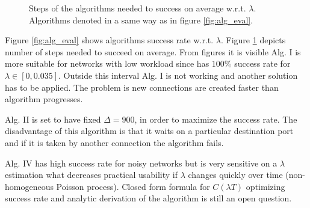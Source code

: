 \documentclass{llncs}
\begin{document}
\begin{figure}[H]
{}
\caption{Steps of the algorithms needed to success on average w.r.t. $\lambda$. Algorithms denoted in a same way as in figure \ref{fig:alg_eval}.}
\label{fig:alg_steps}
\end{figure}
Figure \ref{fig:alg_eval} shows algorithms success rate w.r.t. $\lambda$. 
Figure \ref{fig:alg_steps} depicts number of steps needed 
to succeed on average. From figures it is visible Alg. I is more suitable for networks with low 
workload since has $100\%$ success rate for $\lambda \in [0, 0.035]$. Outside this interval 
Alg. I is not working and another solution has to be applied. The problem is new connections are
created faster than algorithm progresses.

Alg. II is set to have fixed $\Delta=900$, in order to maximize the success rate. The disadvantage of this
algorithm is that it waits on a particular destination port and if it is taken by another connection
the algorithm fails. 

Alg. IV has high success rate for 
noisy networks but is very sensitive on a $\lambda$ estimation what decreases practical usability 
if $\lambda$ changes quickly over time (non-homogeneous Poisson process). Closed form formula for $C(\lambda T)$ 
optimizing success rate and analytic derivation of the algorithm is still an open question. 

\end{document}
